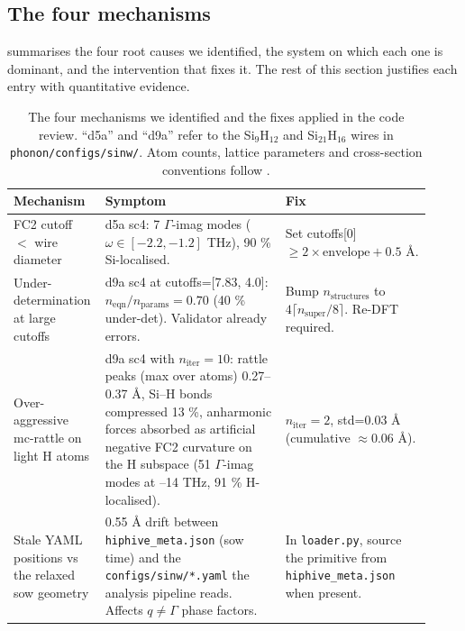\subsection{The four mechanisms}
\label{sec:four_mechanisms}

 summarises the four root causes we
identified, the system on which each one is dominant, and the
intervention that fixes it.  The rest of this section justifies each
entry with quantitative evidence.

\begin{table}[ht]
  \small
  \centering
  \begin{tabular}{p{0.16\linewidth} p{0.42\linewidth} p{0.34\linewidth}}
    \toprule
    Mechanism & Symptom & Fix \\
    \midrule
    FC2 cutoff $<$ wire diameter
      & d5a sc4: 7 $\Gamma$-imag modes ($\omega \in [-2.2,-1.2]$ THz), 90 \%
        Si-localised.
      & Set cutoffs[0] $\geq 2 \times \mathrm{envelope} + 0.5$ Å. \\
    \addlinespace
    Under-determination at large cutoffs
      & d9a sc4 at cutoffs=[7.83, 4.0]: $n_\mathrm{eqn}/n_\mathrm{params} = 0.70$
        (40 \% under-det).  Validator already errors.
      & Bump $n_\mathrm{structures}$ to $4 \lceil n_\mathrm{super}/8 \rceil$.
        Re-DFT required. \\
    \addlinespace
    Over-aggressive mc-rattle on light H atoms
      & d9a sc4 with $n_\mathrm{iter}=10$: rattle peaks (max over atoms)
        0.27–0.37 Å,
        Si–H bonds compressed 13 \%, anharmonic forces absorbed as
        artificial negative FC2 curvature on the H subspace
        (51 $\Gamma$-imag modes at –14 THz, 91 \% H-localised).
      & $n_\mathrm{iter}=2$, std=0.03 Å (cumulative $\approx 0.06$ Å). \\
    \addlinespace
    Stale YAML positions vs the relaxed sow geometry
      & 0.55 Å drift between \texttt{hiphive\_meta.json} (sow time) and
        the \texttt{configs/sinw/*.yaml} the analysis pipeline reads.
        Affects $q \neq \Gamma$ phase factors.
      & In \texttt{loader.py}, source the primitive from
        \texttt{hiphive\_meta.json} when present. \\
    \bottomrule
  \end{tabular}
  \caption{The four mechanisms we identified and the fixes applied in
  the code review.  ``d5a'' and ``d9a'' refer to the
  Si$_9$H$_{12}$ and Si$_{21}$H$_{16}$ wires in
  \texttt{phonon/configs/sinw/}.  Atom counts, lattice
  parameters and cross-section conventions follow
  \cite{Rurali2010colloquium,Peelaers2009sinw}.}
  \label{tab:imag_mechanisms}
\end{table}

